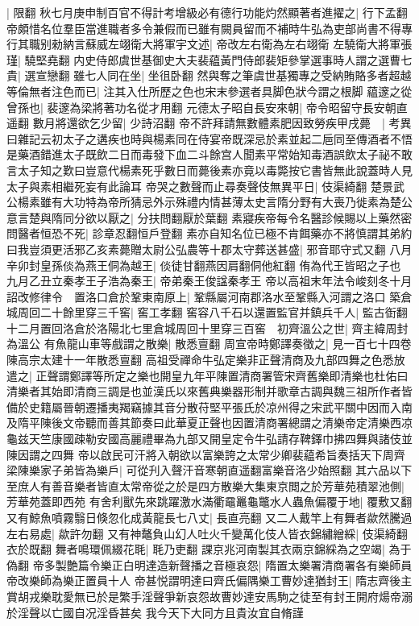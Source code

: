 |{
	限翻}
秋七月庚申制百官不得計考增級必有德行功能灼然顯著者進擢之|{
	行下孟翻}
帝頗惜名位羣臣當進職者多令兼假而已雖有闕員留而不補時牛弘為吏部尚書不得專行其職别勑納言蘇威左翊衛大將軍宇文述|{
	帝改左右衛為左右翊衛}
左驍衛大將軍張瑾|{
	驍堅堯翻}
内史侍郎虞世基御史大夫裴藴黃門侍郎裴矩參掌選事時人謂之選曹七貴|{
	選宣戀翻}
雖七人同在坐|{
	坐徂卧翻}
然與奪之筆虞世基獨專之受納賄賂多者超越等倫無者注色而已|{
	注其入仕所歷之色也宋末參選者具脚色狀今謂之根脚}
藴邃之從曾孫也|{
	裴邃為梁將著功名從才用翻}
元德太子昭自長安來朝|{
	帝令昭留守長安朝直遥翻}
數月將還欲乞少留|{
	少詩沼翻}
帝不許拜請無數體素肥因致勞疾甲戌薨　|{
	考異曰雜記云初太子之遘疾也時與楊素同在侍宴帝既深忌於素並起二巵同至傳酒者不悟是藥酒錯進太子既飲二日而毒發下血二斗餘宫人聞素平常始知毒酒誤飲太子祕不敢言太子知之歎曰豈意代楊素死乎數日而薨後素亦竟以毒斃按它書皆無此說蓋時人見太子與素相繼死妄有此論耳}
帝哭之數聲而止尋奏聲伎無異平日|{
	伎渠綺翻}
楚景武公楊素雖有大功特為帝所猜忌外示殊禮内情甚薄太史言隋分野有大喪乃徙素為楚公意言楚與隋同分欲以厭之|{
	分扶問翻厭於葉翻}
素寢疾帝每令名醫診候賜以上藥然密問醫者恒恐不死|{
	診章忍翻恒戶登翻}
素亦自知名位已極不肯餌藥亦不將慎謂其弟約曰我豈須更活邪乙亥素薨贈太尉公弘農等十郡太守葬送甚盛|{
	邪音耶守式又翻}
八月辛卯封皇孫倓為燕王侗為越王|{
	倓徒甘翻燕因肩翻侗他紅翻}
侑為代王皆昭之子也　九月乙丑立秦孝王子浩為秦王|{
	帝弟秦王俊諡秦孝王}
帝以高祖末年法令峻刻冬十月詔改修律令　置洛口倉於鞏東南原上|{
	鞏縣屬河南郡洛水至鞏縣入河謂之洛口}
築倉城周回二十餘里穿三千窖|{
	窖工孝翻}
窖容八千石以還置監官并鎮兵千人|{
	監古衘翻}
十二月置回洛倉於洛陽北七里倉城周回十里穿三百窖　初齊溫公之世|{
	齊主緯周封為溫公}
有魚龍山車等戲謂之散樂|{
	散悉亶翻}
周宣帝時鄭譯奏徵之|{
	見一百七十四卷陳高宗太建十一年散悉亶翻}
高祖受禪命牛弘定樂非正聲清商及九部四舞之色悉放遣之|{
	正聲謂鄭譯等所定之樂也開皇九年平陳置清商署管宋齊舊樂即清樂也杜佑曰清樂者其始即清商三調是也並漢氏以來舊典樂器形制并歌章古調與魏三祖所作者皆備於史籍屬晉朝遷播夷羯竊據其音分散苻堅平張氏於凉州得之宋武平關中因而入南及隋平陳後文帝聽而善其節奏曰此華夏正聲也因置清商署總謂之清樂帝定清樂西凉龜兹天竺康國疎勒安國高麗禮畢為九部又開皇定令牛弘請存鞞鐸巾拂四舞與諸伎並陳因謂之四舞}
帝以啟民可汗將入朝欲以富樂誇之太常少卿裴藴希旨奏括天下周齊梁陳樂家子弟皆為樂戶|{
	可從刋入聲汗音寒朝直遥翻富樂音洛少始照翻}
其六品以下至庶人有善音樂者皆直太常帝從之於是四方散樂大集東京閲之於芳華苑積翠池側|{
	芳華苑蓋即西苑}
有舍利獸先來跳躍激水滿衢黿鼉龜鼈水人蟲魚偏覆于地|{
	覆敷又翻}
又有鯨魚噴霧翳日倏忽化成黃龍長七八丈|{
	長直亮翻}
又二人戴竿上有舞者歘然騰過左右易處|{
	歘許勿翻}
又有神鼇負山幻人吐火千變萬化伎人皆衣錦繡繒綵|{
	伎渠綺翻衣於既翻}
舞者鳴環佩綴花毦|{
	毦乃吏翻}
課京兆河南製其衣兩京錦綵為之空竭|{
	為于偽翻}
帝多製艶篇令樂正白明達造新聲播之音極哀怨|{
	隋置太樂署清商署各有樂師員帝改樂師為樂正置員十人}
帝甚悦謂明達曰齊氏偏隅樂工曹妙達猶封王|{
	隋志齊後主賞胡戎樂耽愛無已於是繁手淫聲爭新哀怨故曹妙達安馬駒之徒至有封王開府煬帝溺於淫聲以亡國自况淫昏甚矣}
我今天下大同方且貴汝宜自脩謹

